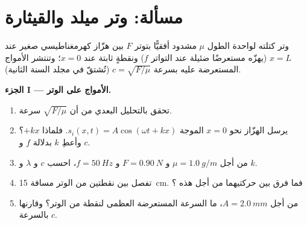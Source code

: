 \section{مسألة: وتر ميلد والقيثارة}

\begin{problem}
\label{pb:b1:wave-propagation:1}
وتر كتلته لواحدة الطول $\mu$ مشدود أفقيًّا بتوتر
$F$ بين هزّاز كهرمغناطيسي صغير عند $x = L$ (يهزّه
مستعرضًا  ضئيلة عند التواتر $f$) ونقطةٍ
ثابتة عند $x = 0$؛ وتنتشر الأمواج المستعرضة عليه بسرعة
$c = \sqrt{F/\mu}$ (تُشتقّ في مجلد السنة الثانية).

\medskip
\noindent\textbf{الجزء I --- الأمواج على الوتر.}
\begin{enumerate}
  \item تحقق بالتحليل البعدي من أن $\sqrt{F/\mu}$ سرعة.
  \item يرسل الهزّاز نحو $x = 0$ الموجة
        $s_i(x, t) = A\cos(\omega t + kx)$. فلماذا  $+kx$؟ وأعطِ $k$
        بدلالة $f$ و $c$.
  \item من أجل $\mu = \qty{1.0}{g/m}$ و $F = \qty{0.90}{N}$ و
        $f = \qty{50}{Hz}$، احسب $c$ و $\lambda$ و $k$.
  \item تفصل بين نقطتين من الوتر مسافة \qty{15}{cm}. فما
        فرق  بين حركتيهما من أجل هذه ؟
  \item من أجل $A = \qty{2.0}{mm}$، ما السرعة المستعرضة
        العظمى لنقطة من الوتر؟ وقارنها بالسرعة $c$.
\end{enumerate}


\end{problem}
